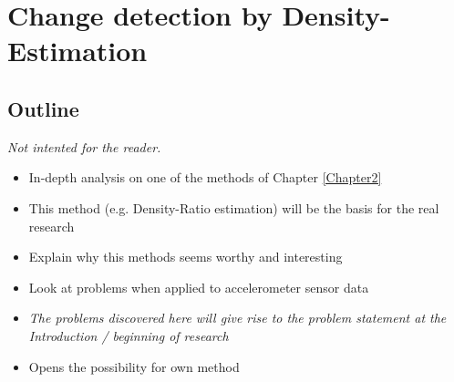 
\chapter{Change detection by Density-Estimation}

\label{Chapter3} %


\section{Outline}
\emph{Not intented for the reader.}
\begin{itemize}
  \item In-depth analysis on one of the methods of Chapter \ref{Chapter2}
  \item This method (e.g. Density-Ratio estimation) will be the basis for the real research
  \item Explain why this methods seems worthy and interesting
  \item Look at problems when applied to accelerometer sensor data
  \item \emph{The problems discovered here will give rise to the problem statement at the Introduction / beginning of research}
  \item Opens the possibility for own method
\end{itemize}